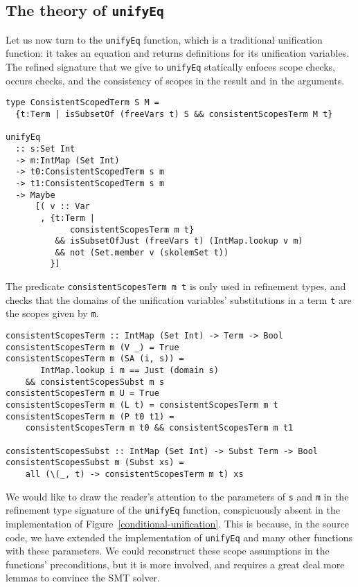 \documentclass[sigconf, review]{acmart}
\newcommand{\tc}[1]{{\small\texttt{#1}}}
\begin{document}
\subsection{The theory of \tc{unifyEq}}
\label{checking-unifyEq}

Let us now turn to the \tc{unifyEq} function, which is a traditional unification
function: it takes an equation and returns definitions for its unification
variables.
The refined signature that we give to \tc{unifyEq} statically enfoces scope checks, occurs checks,
and the consistency of scopes in the result and in the arguments.

\begin{verbatim}
type ConsistentScopedTerm S M =
  {t:Term | isSubsetOf (freeVars t) S && consistentScopesTerm M t}

unifyEq
  :: s:Set Int
  -> m:IntMap (Set Int)
  -> t0:ConsistentScopedTerm s m
  -> t1:ConsistentScopedTerm s m
  -> Maybe
      [( v :: Var
       , {t:Term |
             consistentScopesTerm m t}
          && isSubsetOfJust (freeVars t) (IntMap.lookup v m)
          && not (Set.member v (skolemSet t))
         }]
\end{verbatim}

The predicate \tc{consistentScopesTerm m t} is only used in refinement types, and
checks that the domains of the unification variables' substitutions in a term
\tc{t} are the scopes given by \tc{m}.

\begin{verbatim}
consistentScopesTerm :: IntMap (Set Int) -> Term -> Bool
consistentScopesTerm m (V _) = True
consistentScopesTerm m (SA (i, s)) =
       IntMap.lookup i m == Just (domain s)
    && consistentScopesSubst m s
consistentScopesTerm m U = True
consistentScopesTerm m (L t) = consistentScopesTerm m t
consistentScopesTerm m (P t0 t1) =
    consistentScopesTerm m t0 && consistentScopesTerm m t1

consistentScopesSubst :: IntMap (Set Int) -> Subst Term -> Bool
consistentScopesSubst m (Subst xs) =
    all (\(_, t) -> consistentScopesTerm m t) xs
\end{verbatim}

We would like to draw the reader's attention to the parameters of \tc{s}
and \tc{m} in the refinement type signature of the \tc{unifyEq} function,
conspicuously absent in the implementation of
Figure~\ref{conditional-unification}. This is because, in the source code,
we have extended the implementation of \tc{unifyEq} and many other functions
with these parameters. We could reconstruct these scope assumptions in the
functions' preconditions, but it is more involved, and requires a great deal more
lemmas to convince the SMT solver.
\end{document}

